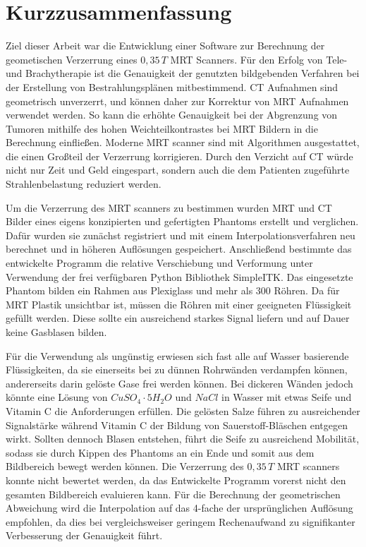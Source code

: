 \chapter*{Kurzzusammenfassung} 

Ziel dieser Arbeit war die Entwicklung einer Software zur Berechnung der geometischen Verzerrung eines $0,35\, T$ MRT Scanners.
Für den Erfolg von Tele- und Brachytherapie ist die Genauigkeit der genutzten bildgebenden Verfahren bei der Erstellung von Bestrahlungsplänen mitbestimmend.
CT Aufnahmen sind geometrisch unverzerrt, und können daher zur Korrektur von MRT Aufnahmen verwendet werden.
So kann die erhöhte Genauigkeit bei der Abgrenzung von Tumoren mithilfe des hohen Weichteilkontrastes bei MRT Bildern in die Berechnung einfließen.
Moderne MRT scanner sind mit Algorithmen ausgestattet, die einen Großteil der Verzerrung korrigieren.
Durch den Verzicht auf CT würde nicht nur Zeit und Geld eingespart, sondern auch die dem Patienten zugeführte Strahlenbelastung reduziert werden.

Um die Verzerrung des MRT scanners zu bestimmen wurden MRT und CT Bilder eines eigens konzipierten und gefertigten Phantoms erstellt und verglichen.
Dafür wurden sie zunächst registriert und mit einem Interpolationsverfahren neu berechnet und in höheren Auflösungen gespeichert.
Anschließend bestimmte das entwickelte Programm die relative Verschiebung und Verformung unter Verwendung der frei verfügbaren Python Bibliothek {SimpleITK}.
Das eingesetzte Phantom bilden ein Rahmen aus Plexiglass und mehr als 300 Röhren.
Da für MRT Plastik unsichtbar ist, müssen die Röhren mit einer geeigneten Flüssigkeit gefüllt werden.
Diese sollte ein ausreichend starkes Signal liefern und auf Dauer keine Gasblasen bilden.

Für die Verwendung als ungünstig erwiesen sich fast alle auf Wasser basierende Flüssigkeiten, da sie einerseits bei zu dünnen Rohrwänden verdampfen können, andererseits darin gelöste Gase frei werden können.
Bei dickeren Wänden jedoch könnte eine Lösung von $CuSO_4\cdot5H_2O$ und $NaCl$ in Wasser mit etwas Seife und Vitamin C die Anforderungen erfüllen. Die gelösten Salze führen zu ausreichender Signalstärke während Vitamin C der Bildung von Sauerstoff-Bläschen entgegen wirkt.
Sollten dennoch Blasen entstehen, führt die Seife zu ausreichend Mobilität, sodass sie durch Kippen des Phantoms an ein Ende und somit aus dem Bildbereich bewegt werden können.
Die Verzerrung des $0,35\, T$ MRT scanners konnte nicht bewertet werden, da das Entwickelte Programm vorerst nicht den gesamten Bildbereich evaluieren kann.
Für die Berechnung der geometrischen Abweichung wird die Interpolation auf das 4-fache der ursprünglichen Auflösung empfohlen, da dies bei vergleichsweiser geringem Rechenaufwand zu signifikanter Verbesserung der Genauigkeit führt.


